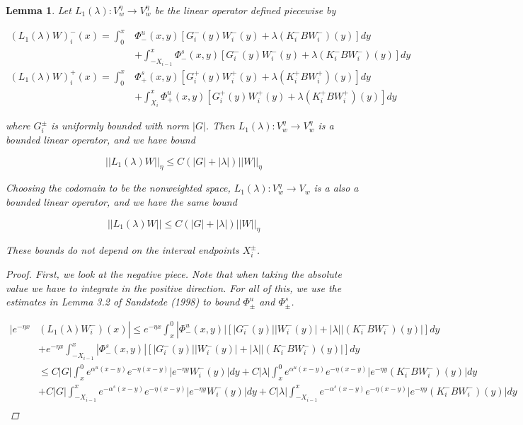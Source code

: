 \documentclass[12pt]{article}
\newtheorem{lemma}{Lemma}
\begin{document}
\begin{lemma}

Let $L_1(\lambda): V_w^\eta \rightarrow V_w^\eta$ be the linear operator defined piecewise by

\begin{align*}
(L_1(\lambda)W)_i^-(x) = \int_0^x &\Phi^u_-(x, y)[G_i^-(y) W_i^-(y) + \lambda (K_i^- B W_i^-)(y) ] dy \\
&+ \int_{-X_{i-1}}^x \Phi^s_-(x, y)[G_i^-(y) W_i^-(y) + \lambda (K_i^-B W_i^-)(y) ] dy \\
(L_1(\lambda)W)_i^+(x) = \int_0^x &\Phi^s_+(x, y)[G_i^+(y) W_i^+(y) + \lambda (K_i^+ B W_i^+)(y)] dy \\
&+ \int_{X_{i}}^x \Phi^u_+(x, y)[G_i^+(y) W_i^+(y) + \lambda (K_i^+ B W_i^+)(y) ] dy
\end{align*}

where $G_i^\pm$ is uniformly bounded with norm $|G|$. Then $L_1(\lambda): V_w^\eta \rightarrow V_w^\eta$ is a bounded linear operator, and we have bound

\begin{equation}
||L_1(\lambda)W||_\eta \leq C\left(|G| +|\lambda|\right)||W||_\eta
\end{equation}

Choosing the codomain to be the nonweighted space, $L_1(\lambda): V_w^\eta \rightarrow V_w$ is a also a bounded linear operator, and we have the same bound

\begin{equation}
||L_1(\lambda)W|| \leq C\left(|G| +|\lambda|\right)||W||_\eta
\end{equation}

These bounds do not depend on the interval endpoints $X_i^\pm$.\\

\begin{proof}
First, we look at the negative piece. Note that when taking the absolute value we have to integrate in the positive direction. For all of this, we use the estimates in Lemma 3.2 of Sandstede (1998) to bound $\Phi^u_\pm$ and $\Phi^s_\pm$.

\begin{align*}
|e^{-\eta x} & (L_1(\lambda)W_i^-)(x) | \leq  e^{-\eta x} \int_x^0 |\Phi^u_-(x, y)|[|G_i^-(y)||W_i^-(y)| + |\lambda||(K_i^- B W_i^-)(y)| ] dy \\
&+ e^{-\eta x} \int_{-X_{i-1}}^x |\Phi^s_-(x, y)|[|G_i^-(y)||W_i^-(y)| + |\lambda||(K_i^- B W_i^-)(y)| ] dy \\
&\leq C|G| \int_x^0 e^{\alpha^u (x-y)}e^{-\eta(x-y)}|e^{-\eta y} W_i^-(y)| dy 
+ C|\lambda|\int_x^0 e^{\alpha^u (x-y)}e^{-\eta(x-y)}|e^{-\eta y} (K_i^- B W_i^-)(y)| dy \\
&+ C|G| \int_{-X_{i-1}}^x e^{-\alpha^s (x-y)}e^{-\eta(x-y)}|e^{-\eta y} W_i^-(y)| dy 
+ C|\lambda|\int_{-X_{i-1}}^x e^{-\alpha^s (x-y)}e^{-\eta(x-y)}|e^{-\eta y} (K_i^- B W_i^-)(y)| dy  \\ 
\end{align*}


\end{proof}
\end{lemma}
\end{document}
